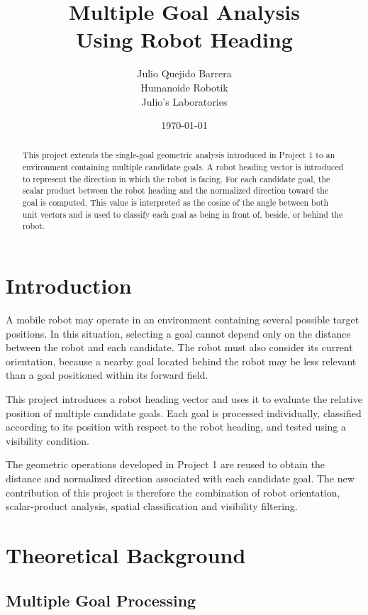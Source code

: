 \documentclass[10pt,twocolumn,a4paper]{article}
\title{
    \textbf{Multiple Goal Analysis\\
    Using Robot Heading}
}
\author{
    Julio Quejido Barrera\\
    Humanoide Robotik\\
    Julio's Laboratories
}
\date{\today}
\begin{document}

\maketitle

\begin{abstract}
This project extends the single-goal geometric analysis 
introduced in Project 1 to an environment containing 
multiple candidate goals. A robot heading vector is 
introduced to represent the direction in which the 
robot is facing. For each candidate goal, the scalar 
product between the robot heading and the normalized 
direction toward the goal is computed. This value 
is interpreted as the cosine of the angle between 
both unit vectors and is used to classify each goal 
as being in front of, beside, or behind the robot.
\end{abstract}

\section{Introduction}

A mobile robot may operate in an environment containing 
several possible target positions. In this situation, 
selecting a goal cannot depend only on the distance 
between the robot and each candidate. The robot must 
also consider its current orientation, because a nearby 
goal located behind the robot may be less relevant than 
a goal positioned within its forward field.

This project introduces a robot heading vector and uses 
it to evaluate the relative position of multiple candidate 
goals. Each goal is processed individually, classified 
according to its position with respect to the robot heading, 
and tested using a visibility condition.

The geometric operations developed in Project 1 are reused 
to obtain the distance and normalized direction associated 
with each candidate goal. The new contribution of this project 
is therefore the combination of robot orientation, scalar-product 
analysis, spatial classification and visibility filtering.

\section{Theoretical Background}

\subsection{Multiple Goal Processing}
\end{document}

